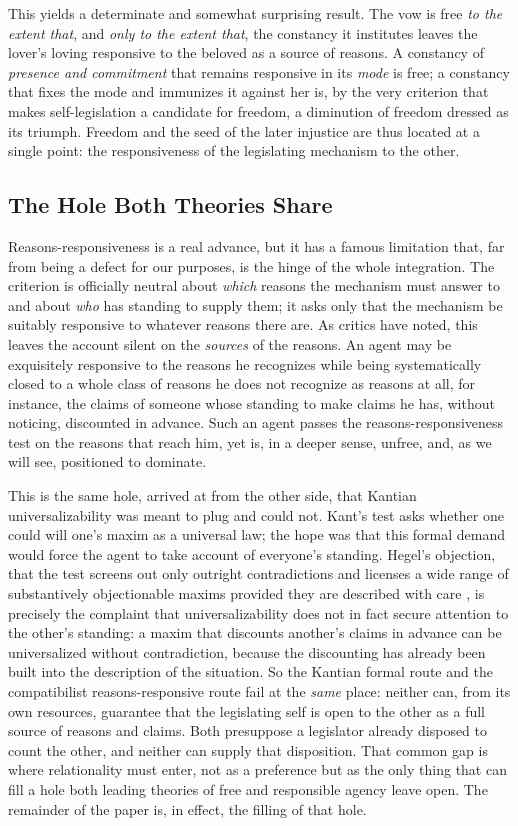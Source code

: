 \documentclass[11pt,a4paper]{article}
\begin{document}
This yields a determinate and somewhat surprising result. The vow is free \emph{to the extent that}, and \emph{only to the extent that}, the constancy it institutes leaves the lover's loving responsive to the beloved as a source of reasons. A constancy of \emph{presence and commitment} that remains responsive in its \emph{mode} is free; a constancy that fixes the mode and immunizes it against her is, by the very criterion that makes self-legislation a candidate for freedom, a diminution of freedom dressed as its triumph. Freedom and the seed of the later injustice are thus located at a single point: the responsiveness of the legislating mechanism to the other.

\subsection{The Hole Both Theories Share}

Reasons-responsiveness is a real advance, but it has a famous limitation that, far from being a defect for our purposes, is the hinge of the whole integration. The criterion is officially neutral about \emph{which} reasons the mechanism must answer to and about \emph{who} has standing to supply them; it asks only that the mechanism be suitably responsive to whatever reasons there are. As critics have noted, this leaves the account silent on the \emph{sources} of the reasons. An agent may be exquisitely responsive to the reasons he recognizes while being systematically closed to a whole class of reasons he does not recognize as reasons at all, for instance, the claims of someone whose standing to make claims he has, without noticing, discounted in advance. Such an agent passes the reasons-responsiveness test on the reasons that reach him, yet is, in a deeper sense, unfree, and, as we will see, positioned to dominate.

This is the same hole, arrived at from the other side, that Kantian universalizability was meant to plug and could not. Kant's test asks whether one could will one's maxim as a universal law; the hope was that this formal demand would force the agent to take account of everyone's standing. Hegel's objection, that the test screens out only outright contradictions and licenses a wide range of substantively objectionable maxims provided they are described with care \parencite[§135]{hegel1820right}, is precisely the complaint that universalizability does not in fact secure attention to the other's standing: a maxim that discounts another's claims in advance can be universalized without contradiction, because the discounting has already been built into the description of the situation. So the Kantian formal route and the compatibilist reasons-responsive route fail at the \emph{same} place: neither can, from its own resources, guarantee that the legislating self is open to the other as a full source of reasons and claims. Both presuppose a legislator already disposed to count the other, and neither can supply that disposition. That common gap is where relationality must enter, not as a preference but as the only thing that can fill a hole both leading theories of free and responsible agency leave open. The remainder of the paper is, in effect, the filling of that hole.
\end{document}
